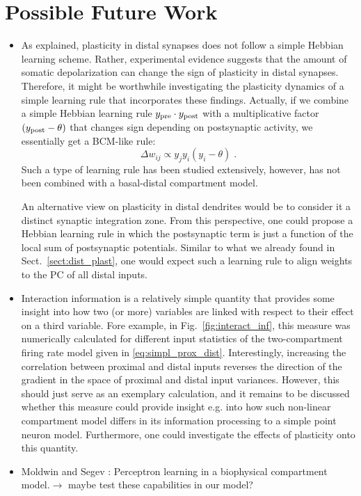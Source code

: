 \documentclass[10pt,a4paper,draft]{article}
\begin{document}
\section{Possible Future Work}
\begin{itemize}
	\item As explained, plasticity in distal synapses does not follow a simple Hebbian learning scheme. Rather, experimental evidence suggests that the amount of somatic depolarization can change the sign of plasticity in distal synapses. Therefore, it might be worthwhile investigating the plasticity dynamics of a simple learning rule that incorporates these findings. Actually, if we combine a simple Hebbian learning rule $y_{\rm pre} \cdot y_{\rm post}$ with a multiplicative factor $(y_{\rm post}-\theta)$ that changes sign depending on postsynaptic activity, we essentially get a BCM-like rule:
	\begin{equation}
		\Delta w_{ij} \propto y_j y_i (y_i - \theta) \; .
	\end{equation}
	Such a type of learning rule has been studied extensively, however, has not been combined with a basal-distal compartment model.
	
	An alternative view on plasticity in distal dendrites would be to consider it a distinct synaptic integration zone. From this perspective, one could propose a Hebbian learning rule in which the postsynaptic term is just a function of the local sum of postsynaptic potentials. Similar to what we already found in Sect.~\ref{sect:dist_plast}, one would expect such a learning rule to align weights to the PC of all distal inputs.
	
	\item Interaction information is a relatively simple quantity that provides some insight into how two (or more) variables are linked with respect to their effect on a third variable. Fore example, in Fig.~\ref{fig:interact_inf}, this measure was numerically calculated for different input statistics of the two-compartment firing rate model given in \eqref{eq:simpl_prox_dist}. Interestingly, increasing the correlation between proximal and distal inputs reverses the direction of the gradient in the space of proximal and distal input variances. However, this should just serve as an exemplary calculation, and it remains to be discussed whether this measure could provide insight e.g. into how such non-linear compartment model differs in its information processing to a simple point neuron model. Furthermore, one could investigate the effects of plasticity onto this quantity.
	\item Moldwin and Segev \cite{Moldwin_2020}: Perceptron learning in a biophysical compartment model.$\rightarrow$ maybe test these capabilities in our model?
\end{itemize}
\end{document}
